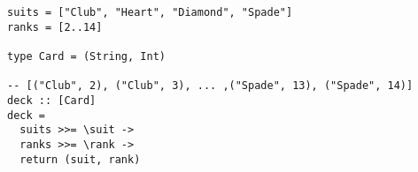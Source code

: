 \begin{algorithm}

\begin{verbatim}
suits = ["Club", "Heart", "Diamond", "Spade"]
ranks = [2..14]

type Card = (String, Int)

-- [("Club", 2), ("Club", 3), ... ,("Spade", 13), ("Spade", 14)]
deck :: [Card]
deck =
  suits >>= \suit ->
  ranks >>= \rank ->
  return (suit, rank)
\end{verbatim}

\caption{Monadic bind in list monad results in a cartesian product. %
\label{monad:bind}}
\end{algorithm}